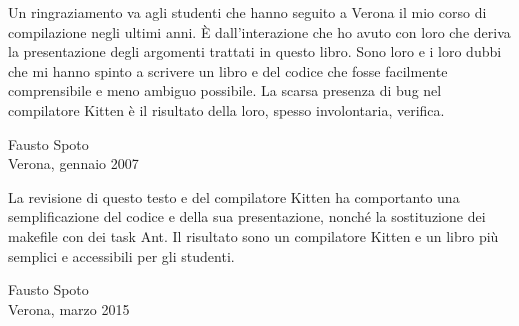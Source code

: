 Un ringraziamento va agli studenti che hanno seguito a Verona
il mio corso di compilazione negli ultimi anni. \`E dall'interazione
che ho avuto con loro che deriva la presentazione degli argomenti trattati
in questo libro. Sono loro e i loro dubbi che mi hanno spinto a
scrivere un libro e del codice che fosse
facilmente comprensibile e meno ambiguo possibile.
La scarsa presenza di bug nel compilatore Kitten \`e il risultato
della loro, spesso involontaria, verifica.

{\flushright Fausto Spoto\\\hfill Verona, gennaio 2007}

La revisione di questo testo e del compilatore Kitten ha comportanto una
semplificazione del codice e della sua presentazione, nonch\'e
la sostituzione dei makefile con dei task Ant. Il risultato sono
un compilatore Kitten e un libro pi\`u semplici e accessibili per
gli studenti.

{\flushright Fausto Spoto\\\hfill Verona, marzo 2015}


\newpage
\tableofcontents
\cleardoublepage

 \setcounter{page}{1}

